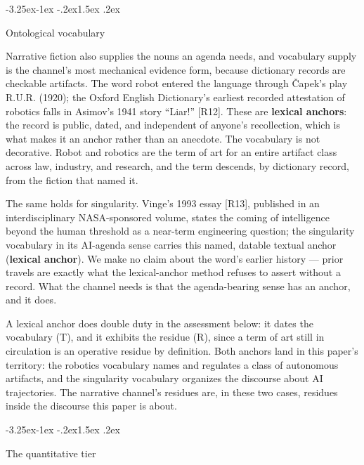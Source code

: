 \documentclass[11pt,a4paper]{article}
\makeatletter
\renewcommand\subsection{\@startsection{subsection}{2}{\z@}%
  {-3.25ex\@plus -1ex \@minus -.2ex}{1.5ex \@plus .2ex}%
  {\normalfont\large\bfseries\raggedright}}
\makeatother
\begin{document}
\subsection{Ontological vocabulary}

Narrative fiction also supplies the nouns an agenda needs, and vocabulary supply is the channel's most mechanical evidence form, because dictionary records are checkable artifacts. The word robot entered the language through Čapek's play R.U.R. (1920); the Oxford English Dictionary's earliest recorded attestation of robotics falls in Asimov's 1941 story ``Liar!'' [R12]. These are \textbf{lexical anchors}: the record is public, dated, and independent of anyone's recollection, which is what makes it an anchor rather than an anecdote. The vocabulary is not decorative. Robot and robotics are the term of art for an entire artifact class across law, industry, and research, and the term descends, by dictionary record, from the fiction that named it.

The same holds for singularity. Vinge's 1993 essay [R13], published in an interdisciplinary NASA-sponsored volume, states the coming of intelligence beyond the human threshold as a near-term engineering question; the singularity vocabulary in its AI-agenda sense carries this named, datable textual anchor (\textbf{lexical anchor}). We make no claim about the word's earlier history — prior travels are exactly what the lexical-anchor method refuses to assert without a record. What the channel needs is that the agenda-bearing sense has an anchor, and it does.

A lexical anchor does double duty in the assessment below: it dates the vocabulary (T), and it exhibits the residue (R), since a term of art still in circulation is an operative residue by definition. Both anchors land in this paper's territory: the robotics vocabulary names and regulates a class of autonomous artifacts, and the singularity vocabulary organizes the discourse about AI trajectories. The narrative channel's residues are, in these two cases, residues inside the discourse this paper is about.

\subsection{The quantitative tier}
\end{document}
